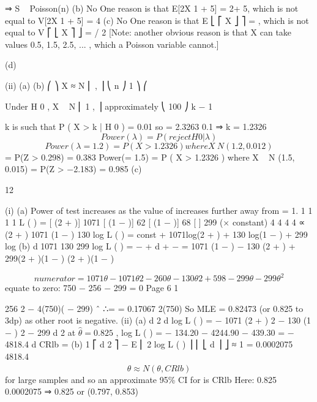\documentclass[a4paper,12pt]{article}
\begin{document}
⇒ S ~ Poisson(n\lambda)
(b)
No
One reason is that E[2X 1 + 5] = 2\lambda + 5, which is not equal to V[2X 1 + 5] = 4%
(c)
No
One reason is that E ⎣ ⎡ X ⎦ ⎤ = \lambda , which is not equal to V ⎡ ⎣ X ⎤ ⎦ = \lambda / 2
[Note: another obvious reason is that X can take values 0.5, 1.5, 2.5, ... , which a Poisson variable cannot.]

(d)
\item (ii)
(a)
(b)
⎛ \lambda ⎞
X ≈ N ⎜ \lambda , ⎟
⎝ n ⎠
1 ⎞
⎛

Under H 0 , X ~ N ⎜ 1 ,
⎟ approximately
⎝ 100 ⎠
k − 1

k is such that P ( X > k | H 0 ) = 0.01 so
= 2.3263
0.1
⇒ k = 1.2326
\[Power(\lambda) = P(reject H 0 |\lambda)\]
\[Power(\lambda = 1.2) = P ( X > 1.2326 ) where X ~ N (1.2, 0.012)\]
= P(Z > 0.298) = 0.383
Power(\lambda = 1.5) = P ( X > 1.2326 ) where X ~ N (1.5, 0.015)
= P(Z > −2.183) = 0.985
(c)

12
\item (i)
(a)
Power of test increases as the value of \lambda increases further away from
\lambda = 1.
1
1
1
1
L ( \theta ) = [ (2 + \theta )] 1071 [ (1 − \theta )] 62 [ (1 − \theta )] 68 [ \theta ] 299 (× constant)
4
4
4
4
∝ (2 + \theta ) 1071 (1 − \theta ) 130 
log L ( \theta ) = const + 1071log(2 + \theta ) + 130 log(1 − \theta ) + 299 log \theta
(b)
d
1071 130 299
log L ( \theta ) =
−
+
d  +  − \theta
\theta
=
1071 \theta (1 − \theta ) − 130 \theta (2 + \theta ) + 299(2 + \theta )(1 − \theta )
(2 + \theta )(1 − \theta ) \theta

\[numerator = 1071 \theta − 1071 \theta 2 − 260 \theta − 130 \theta 2 + 598 − 299 \theta − 299 \theta^2\]
equate to zero: 750  − 256 \theta − 299 = 0
Page 6
1

256  2 − 4(750)( − 299)
ˆ
∴\theta =
= 0.17067 
2(750)
So MLE \hat{\theta} = 0.82473 (or 0.825 to 3dp) as other root is negative.
(ii)
(a)
d 2
d 
log L ( \theta ) = −
1071
(2 + \theta )
2
−
130
(1 − \theta )
2
−
299
d 2
at $\hat{\theta} = 0.825$ ,
log L ( \theta ) = − 134.20 − 4244.90 − 439.30 = − 4818.4
d 
CRlb =
(b)
1
⎡ d 2
⎤
− E ⎢ 2 log L ( \theta ) ⎥
⎢ ⎣ d \theta
⎥ ⎦
≈
1
= 0.0002075
4818.4
\[\hat{\theta} ≈ N ( \theta , CRlb )\] for large samples
and so an approximate 95\% CI for \theta is \hat{\theta}  CRlb
Here: 0.825  0.0002075 ⇒ 0.825  or (0.797, 0.853)
\end{document}
